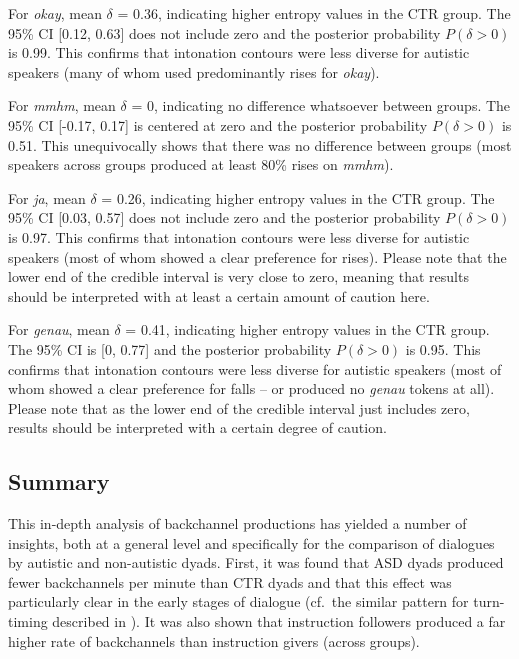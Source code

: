 For \emph{okay}, mean \(\delta\) = 0.36, indicating higher entropy values in the CTR group. The 95\% CI {[}0.12, 0.63{]} does not include zero and the posterior probability \(P(\delta > 0)\) is 0.99. This confirms that intonation contours were less diverse for autistic speakers (many of whom used predominantly rises for \emph{okay}).

For \emph{mmhm}, mean \(\delta\) = 0, indicating no difference whatsoever between groups. The 95\% CI {[}-0.17, 0.17{]} is centered at zero and the posterior probability \(P(\delta > 0)\) is 0.51. This unequivocally shows that there was no difference between groups (most speakers across groups produced at least 80\% rises on \emph{mmhm}).

For \emph{ja}, mean \(\delta\) = 0.26, indicating higher entropy values in the CTR group. The 95\% CI {[}0.03, 0.57{]} does not include zero and the posterior probability \(P(\delta > 0)\) is 0.97. This confirms that intonation contours were less diverse for autistic speakers (most of whom showed a clear preference for rises). Please note that the lower end of the credible interval is very close to zero, meaning that results should be interpreted with at least a certain amount of caution here.

For \emph{genau}, mean \(\delta\) = 0.41, indicating higher entropy values in the CTR group. The 95\% CI is {[}0, 0.77{]} and the posterior probability \(P(\delta > 0)\) is 0.95. This confirms that intonation contours were less diverse for autistic speakers (most of whom showed a clear preference for falls -- or produced no \emph{genau} tokens at all). Please note that as the lower end of the credible interval just includes zero, results should be interpreted with a certain degree of caution.

\subsection{Summary}\label{BCFP_BC_summary}

This in-depth analysis of backchannel productions has yielded a number of insights, both at a general level and specifically for the comparison of dialogues by autistic and non-autistic dyads. First, it was found that ASD dyads produced fewer backchannels per minute than CTR dyads and that this effect was particularly clear in the early stages of dialogue (cf.~the similar pattern for turn-timing described in ). It was also shown that instruction followers produced a far higher rate of backchannels than instruction givers (across groups).

